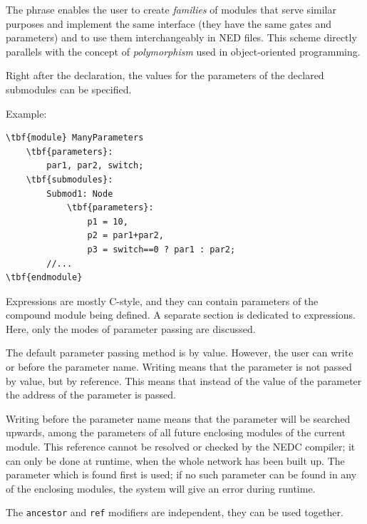 The  phrase enables the user to
create \textit{families} of modules that serve
similar purposes and implement the same interface (they have the same
gates and parameters) and to use them interchangeably in NED files.
This scheme directly parallels with the concept of
\textit{polymorphism} used in object-oriented programming.



Right after the declaration, the values for the parameters of 
the declared submodules can be specified.

Example:


\begin{Verbatim}[commandchars=\\\{\}]
\tbf{module} ManyParameters
    \tbf{parameters}:
        par1, par2, switch;
    \tbf{submodules}:
        Submod1: Node
            \tbf{parameters}:
                p1 = 10,
                p2 = par1+par2,
                p3 = switch==0 ? par1 : par2;
        //...
\tbf{endmodule}
\end{Verbatim}

Expressions are mostly C-style, and they can
contain parameters of the compound module being defined. A separate
section is dedicated to expressions. Here, only the modes of parameter
passing are discussed.

The default parameter passing method is by value. However, the
user can write  or
 before the parameter name.
Writing  means that the parameter is not
passed by value, but by reference.  This means that instead of the
value of the parameter the address of the parameter is passed.

Writing  before the parameter
name means that the parameter will be searched upwards, among the
parameters of all future enclosing modules of the current module. This
reference cannot be resolved or checked by the NEDC compiler; it can
only be done at runtime, when the whole network has been built up. The
parameter which is found first is used; if no such parameter can be
found in any of the enclosing modules, the system will give an error
during runtime.

The \texttt{ancestor} and \texttt{ref} modifiers are independent, they
can be used together.

